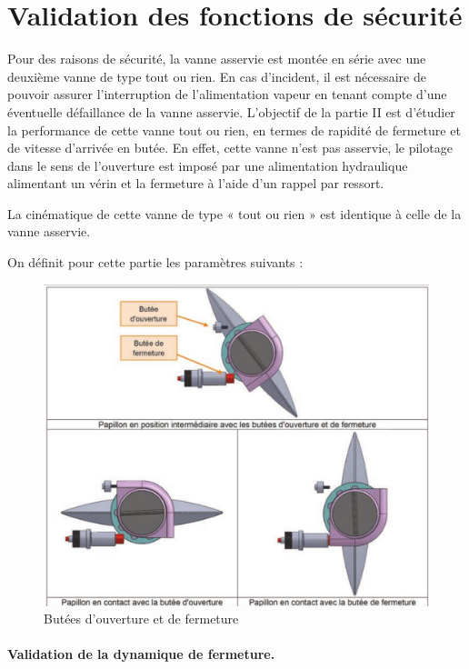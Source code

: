 


\section{Validation des fonctions de sécurité}
    
Pour des raisons de sécurité, la vanne asservie est montée en série avec une deuxième vanne de type tout ou rien. En cas d'incident, il est nécessaire de pouvoir assurer l'interruption de l'alimentation vapeur en tenant compte d'une éventuelle défaillance de la vanne asservie. L'objectif de la partie II est d'étudier la performance de cette vanne tout ou rien, en termes de rapidité de fermeture et de vitesse d'arrivée en butée. En effet, cette vanne n'est pas asservie, le pilotage dans le sens de l'ouverture est imposé par une alimentation hydraulique alimentant un vérin et la fermeture à l'aide d'un rappel par ressort.

La cinématique de cette vanne de type « tout ou rien » est identique à celle de la vanne asservie.

On définit pour cette partie les paramètres suivants :
\begin{figure}[ht!]
\begin{center}
 \includegraphics[width=0.6\linewidth]{img/fig10}
\end{center}
\caption{Butées d'ouverture et de fermeture}
\label{fig10}
\end{figure}

\newpage

\paragraph{Validation de la dynamique de fermeture.}

